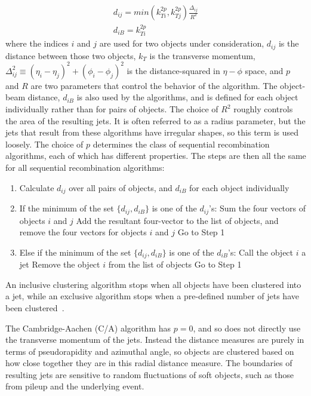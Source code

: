 \begin{align}\label{eq:jet_distance}
    d_{ij} = min\left(k_{Ti}^{2p}, k_{Tj}^{2p}\right)\frac{\Delta_{ij}}{R^2} \\
    d_{iB} = k_{Ti}^{2p}
\end{align}
where the indices $i$ and $j$ are used for two objects under consideration, $d_{ij}$ is the distance between those two objects, $k_T$ is the transverse momentum, $\Delta_{ij}^2 \equiv (\eta_i-\eta_j)^2 + (\phi_i-\phi_j)^2$ is the distance-squared in $\eta-\phi$ space, and $p$ and $R$ are two parameters that control the behavior of the algorithm.
The object-beam distance, $d_{iB}$ is also used by the algorithms, and is defined for each object individually rather than for pairs of objects.
The choice of $R^2$ roughly controls the area of the resulting jets.
It is often referred to as a radius parameter, but the jets that result from these algorithms have irregular shapes, so this term is used loosely.
The choice of $p$ determines the class of sequential recombination algorithms, each of which has different properties.
The steps are then all the same for all sequential recombination algorithms:
\begin{enumerate}
    \item Calculate $d_{ij}$ over all pairs of objects, and $d_{iB}$ for each object individually
    \item If the minimum of the set $\{d_{ij}, d_{iB}\}$ is one of the $d_{ij}$'s:
        \subitem Sum the four vectors of objects $i$ and $j$
        \subitem Add the resultant four-vector to the list of objects, and remove the four vectors for objects $i$ and $j$
        \subitem Go to Step 1
    \item Else if the minimum of the set $\{d_{ij}, d_{iB}\}$ is one of the $d_{iB}$'s:
        \subitem Call the object $i$ a jet
        \subitem Remove the object $i$ from the list of objects
        \subitem Go to Step 1
\end{enumerate}
An inclusive clustering algorithm stops when all objects have been clustered into a jet, while an exclusive algorithm stops when a pre-defined number of jets have been clustered~\cite{jet-algo-review}.

The Cambridge-Aachen (C/A) algorithm has $p=0$, and so does not directly use the transverse momentum of the jets.
Instead the distance measures are purely in terms of pseudorapidity and azimuthal angle, so objects are clustered based on how close together they are in this radial distance measure.
The boundaries of resulting jets are sensitive to random fluctuations of soft objects, such as those from pileup and the underlying event.

